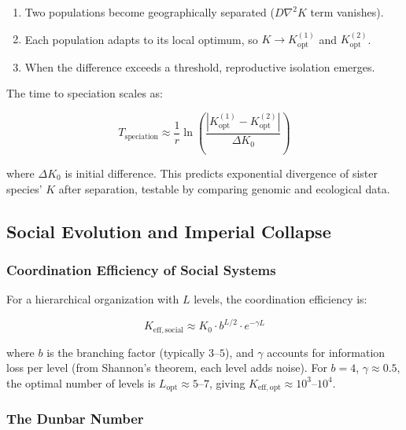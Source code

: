 \documentclass[12pt,a4paper]{article}
\theoremstyle{remark}
\newcommand{\Keffopt}{K_{\mathrm{opt}}}
\begin{document}
	\begin{enumerate}
		\item Two populations become geographically separated ($D \nabla^2 K$ term vanishes).
		\item Each population adapts to its local optimum, so $K \to \Keffopt^{(1)}$ and $\Keffopt^{(2)}$.
		\item When the difference exceeds a threshold, reproductive isolation emerges.
	\end{enumerate}
	
	The time to speciation scales as:
	
	\begin{equation}
		T_{\text{speciation}} \approx \frac{1}{r} \ln\left( \frac{|\Keffopt^{(1)} - \Keffopt^{(2)}|}{\Delta K_0} \right)
		\label{eq:speciation-time}
	\end{equation}
	
	where $\Delta K_0$ is initial difference. This predicts exponential divergence of sister species' $K$ after separation, testable by comparing genomic and ecological data.
	
	\subsection{Social Evolution and Imperial Collapse}
	\label{subsec:social}
	
	\subsubsection{Coordination Efficiency of Social Systems}
	
	For a hierarchical organization with $L$ levels, the coordination efficiency is:
	
	\begin{equation}
		K_{\mathrm{eff},\text{social}} \approx K_0 \cdot b^{L/2} \cdot e^{-\gamma L}
		\label{eq:social-keff}
	\end{equation}
	
	where $b$ is the branching factor (typically $3$--$5$), and $\gamma$ accounts for information loss per level (from Shannon's theorem, each level adds noise). For $b=4$, $\gamma \approx 0.5$, the optimal number of levels is $L_{\text{opt}} \approx 5$--$7$, giving $K_{\mathrm{eff},\text{opt}} \approx 10^3$--$10^4$.
	
	\subsubsection{The Dunbar Number}
	
\end{document}

